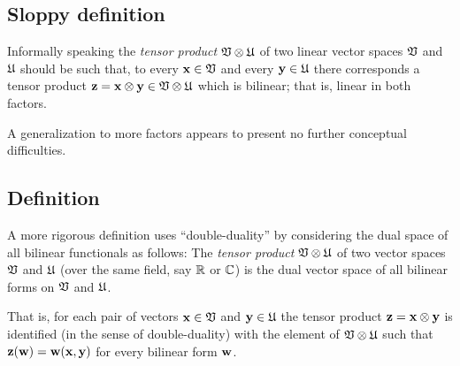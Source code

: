 
\subsection{Sloppy definition}

Informally speaking the {\em tensor product}
 ${\frak V} \otimes {\frak U}$
of two linear vector spaces  ${\frak V}$ and  ${\frak U}$
should be such that,
to every
${\bf x} \in  {\frak V}$
and every
${\bf y} \in  {\frak U}$
there corresponds a tensor product ${\bf z} = {\bf x} \otimes {\bf y}
\in {\frak V} \otimes {\frak U}$
which is bilinear; that is, linear in both factors.

A generalization to more factors appears to present no further conceptual difficulties.

\subsection{Definition}

A more rigorous definition uses ``double-duality'' by
considering the dual space of all bilinear functionals as follows:
The {\em tensor product} ${\frak V} \otimes {\frak U}$ of two vector spaces ${\frak V}$
and
${\frak U}$ (over the same field, say ${\Bbb R}$ or ${\Bbb C}$)
is the dual vector space of all bilinear forms on ${\frak V}$ and ${\frak U}$.

That is, for each pair of vectors ${\bf x} \in  {\frak V}$
and
${\bf y} \in  {\frak U}$   the tensor product ${\bf z} = {\bf x} \otimes {\bf y}$
is identified (in the sense of double-duality) with the element of ${\frak V} \otimes {\frak U}$
such that ${\bf z}({\bf w})={\bf w}({\bf x},{\bf y})$ for every bilinear form
${\bf w}$.

